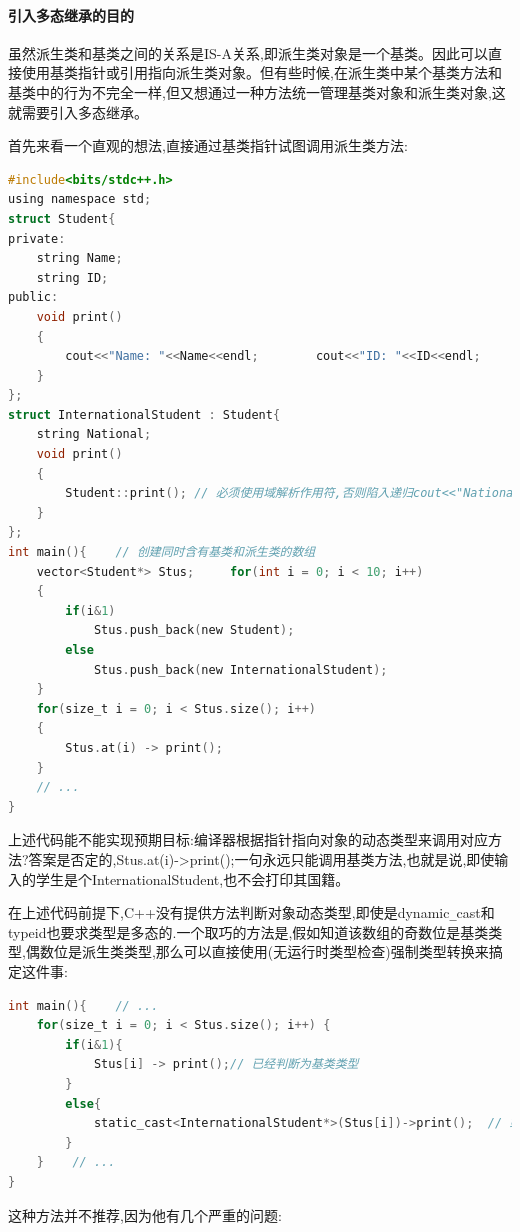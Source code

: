 \documentclass[UTF8]{ctexart}
\begin{document}
\paragraph{引入多态继承的目的}
虽然派生类和基类之间的关系是IS-A关系,即派生类对象是一个基类。因此可以直接使用基类指针或引用指向派生类对象。但有些时候,在派生类中某个基类方法和基类中的行为不完全一样,但又想通过一种方法统一管理基类对象和派生类对象,这就需要引入多态继承。

首先来看一个直观的想法,直接通过基类指针试图调用派生类方法:
\begin{lstlisting}[language = C,basicstyle=\small\ttfamily]
#include<bits/stdc++.h>
using namespace std;
struct Student{    
private:    
    string Name;    
    string ID;
public:    
    void print()    
    {        
        cout<<"Name: "<<Name<<endl;        cout<<"ID: "<<ID<<endl;
    }
};
struct InternationalStudent : Student{   
    string National;
    void print()    
    {        
        Student::print(); // 必须使用域解析作用符,否则陷入递归cout<<"National: "<<National<<endl;    
    }
};
int main(){    // 创建同时含有基类和派生类的数组    
    vector<Student*> Stus;     for(int i = 0; i < 10; i++) 
    {        
        if(i&1)
            Stus.push_back(new Student);      
        else 
            Stus.push_back(new InternationalStudent);
    }
    for(size_t i = 0; i < Stus.size(); i++)     
    {        
        Stus.at(i) -> print();
    }
    // ...
}
\end{lstlisting}
上述代码能不能实现预期目标:编译器根据指针指向对象的动态类型来调用对应方法?答案是否定的,Stus.at(i)->print();一句永远只能调用基类方法,也就是说,即使输入的学生是个InternationalStudent,也不会打印其国籍。

在上述代码前提下,C++没有提供方法判断对象动态类型,即使是dynamic\verb|_|cast和typeid也要求类型是多态的.一个取巧的方法是,假如知道该数组的奇数位是基类类型,偶数位是派生类类型,那么可以直接使用(无运行时类型检查)强制类型转换来搞定这件事:
\begin{lstlisting}[language = C,basicstyle=\small\ttfamily]
int main(){    // ...  
    for(size_t i = 0; i < Stus.size(); i++) {        
        if(i&1){            
            Stus[i] -> print();// 已经判断为基类类型  
        }      
        else{ 
            static_cast<InternationalStudent*>(Stus[i])->print();  // 或(InternationalStudent*)(Stus[i])->print();        
        }    
    }    // ...
}
\end{lstlisting}

这种方法并不推荐,因为他有几个严重的问题:
\end{document}
